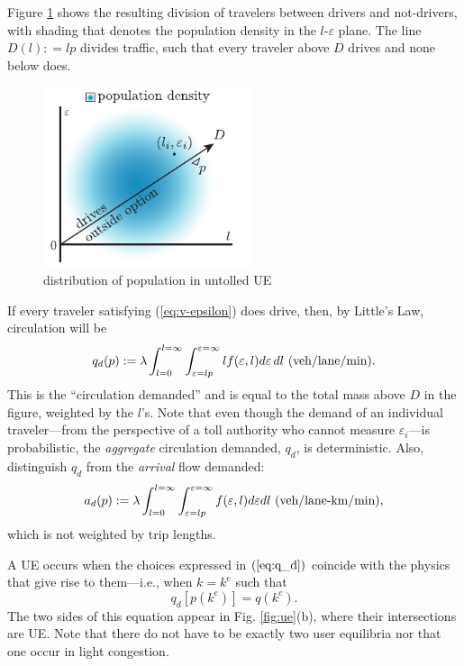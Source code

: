 \documentclass[preprint,authoryear]{elsarticle}
\newcommand{\ve}{\varepsilon}
\begin{document}
Figure \ref{fig:density} shows the resulting division of travelers between drivers and not-drivers, with shading that denotes the population density in the $l$-$\ve$ plane. The line $D(l): = lp$ divides traffic, such that every traveler above $D$ drives and none below does.
\begin{figure}
	\centering
	\includegraphics[width=0.55\textwidth]{img/mode-split3}
	\caption{distribution of population in untolled UE}
	\label{fig:density}
\end{figure}

If every traveler satisfying (\ref{eq:v-epsilon}) does drive, then, by Little's Law, circulation will be
\begin{equation}\label{eq:q_d}
		q_d(p) := \lambda \int_{l=0}^{l=\infty} \int_{\ve=lp}^{\ve=\infty} l f(\ve,l) d\ve \, dl \,\, \textnormal{(veh/lane/min).}
\end{equation}
This is the ``circulation demanded'' and is equal to the total mass above $D$ in the figure, weighted by the $l$'s. Note that even though the demand of an individual traveler---from the perspective of a toll authority who cannot measure $\varepsilon_i$---is probabilistic, the \emph{aggregate} circulation demanded, $q_d$, is deterministic. Also, distinguish $q_d$ from the \emph{arrival} flow demanded:
\begin{equation}\label{eq:a_d}
	a_d(p) := \lambda \int_{l=0}^{l=\infty} \int_{\ve=lp}^{\ve=\infty} f(\ve,l)d\ve dl \,\, \textnormal{(veh/lane-km/min)},
\end{equation}
which is not weighted by trip lengths.

A UE occurs when the choices expressed in $(\ref{eq:q_d})$ coincide with the physics that give rise to them---i.e., when $k=k^e$ such that
\begin{equation}\label{eq:equilibrium-n}
	q_d[p(k^e)] = q(k^e).
\end{equation}
The two sides of this equation appear in Fig. \ref{fig:ue}(b), where their intersections are UE. Note that there do not have to be exactly two user equilibria nor that one occur in light congestion.
\end{document}
